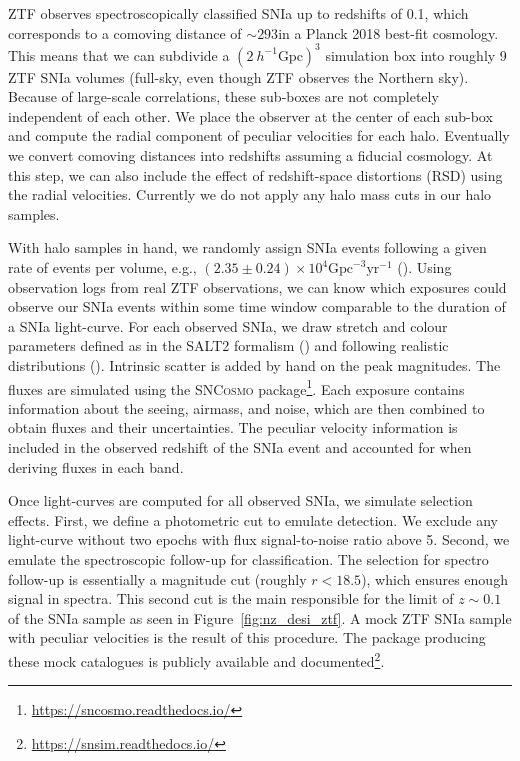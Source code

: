 ZTF observes spectroscopically classified SNIa 
up to redshifts of 0.1, which corresponds to a comoving distance 
of $\sim 293$\hmpc in a Planck 2018 best-fit cosmology. 
This means that we can subdivide a $(2~h^{-1}\text{Gpc})^3$ simulation box into 
roughly 9 ZTF SNIa volumes (full-sky, even though ZTF observes the Northern sky).  
Because of large-scale correlations, these sub-boxes are not completely independent of each other. 
We place the observer at the center of each sub-box and compute the radial 
component of peculiar velocities for each halo. 
Eventually we convert comoving distances into redshifts assuming a fiducial cosmology. 
At this step, we can also include the effect of redshift-space distortions (RSD) using the radial velocities.
Currently we do not apply any halo mass cuts in our halo samples. 

With halo samples in hand, we randomly assign SNIa events following a given rate of 
events per volume, e.g., $(2.35 \pm 0.24) \times 10^4 \text{Gpc}^{-3} \text{yr}^{-1}$ 
(\cite{perleyZwickyTransientFacility2020}).
Using observation logs from real ZTF observations, we can know which exposures 
could observe our SNIa events within some time window comparable to the duration of 
a SNIa light-curve. For each observed SNIa, we draw stretch and colour parameters 
defined as in the SALT2 formalism (\cite{guySALT2UsingDistant2007}) and following 
realistic distributions
(\cite{scolnicMEASURINGTYPEIA2016, nicolasRedshiftEvolutionUnderlying2021}).
Intrinsic scatter is added by hand on the peak magnitudes. 
The fluxes are simulated using the \textsc{SNCosmo} package\footnote{\url{https://sncosmo.readthedocs.io/}}.
Each exposure contains information about the seeing, airmass, and noise, which are then combined 
to obtain fluxes and their uncertainties. 
The peculiar velocity information is included in the observed redshift of the SNIa event
and accounted for when deriving fluxes in each band. 

Once light-curves are computed for all observed SNIa, we simulate 
selection effects. First, we define a photometric cut to emulate detection.
We exclude any light-curve without two epochs with flux signal-to-noise ratio 
above 5. Second, we emulate the spectroscopic follow-up for classification.
The selection for spectro follow-up is essentially a magnitude cut (roughly $r<18.5$),
which ensures enough signal in spectra.  
This second cut is the main responsible for the limit of $z \sim 0.1$ of the SNIa sample 
as seen in Figure~\ref{fig:nz_desi_ztf}. 
A mock ZTF SNIa sample with peculiar velocities is the result of this procedure. 
The package producing these mock catalogues is publicly 
available and documented\footnote{\url{https://snsim.readthedocs.io/}}. 

